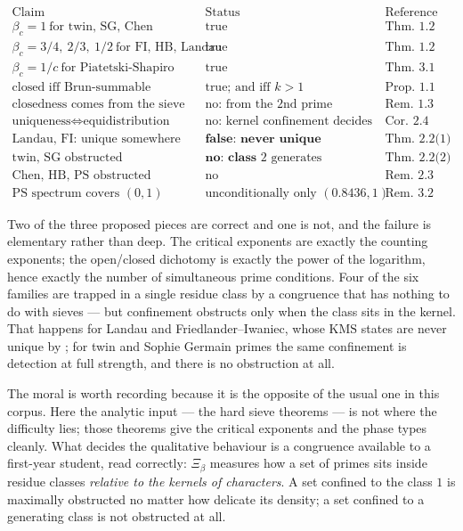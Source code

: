 \documentclass[11pt]{amsart}
\numberwithin{equation}{section}
\theoremstyle{definition}
\theoremstyle{remark}
\begin{document}
\[
\begin{array}{lll}
\text{Claim} & \text{Status} & \text{Reference}\\\hline
\beta_c=1\ \text{for twin, SG, Chen} & \text{true} & \text{Thm.~1.2}\\
\beta_c=3/4,\ 2/3,\ 1/2\ \text{for FI, HB, Landau} & \text{true} & \text{Thm.~1.2}\\
\beta_c=1/c\ \text{for Piatetski-Shapiro} & \text{true} & \text{Thm.~3.1}\\
\text{closed iff Brun-summable} & \text{true; and iff }k>1 & \text{Prop.~1.1}\\
\text{closedness comes from the sieve} & \text{no: from the 2nd prime condition} & \text{Rem.~1.3}\\
\text{uniqueness}\iff\text{equidistribution} & \text{no: kernel confinement decides} & \text{Cor.~2.4}\\
\text{Landau, FI: unique somewhere} & \textbf{false: never unique} & \text{Thm.~2.2(1)}\\
\text{twin, SG obstructed} & \textbf{no: class }2\text{ generates} & \text{Thm.~2.2(2)}\\
\text{Chen, HB, PS obstructed} & \text{no} & \text{Rem.~2.3}\\
\text{PS spectrum covers }(0,1) & \text{unconditionally only }(0.8436,1) & \text{Rem.~3.2}
\end{array}
\]

Two of the three proposed pieces are correct and one is not, and the failure is elementary
rather than deep. The critical exponents are exactly the counting exponents; the open/closed
dichotomy is exactly the power of the logarithm, hence exactly the number of simultaneous
prime conditions. Four of the six families are trapped in a single residue class by a
congruence that has nothing to do with sieves --- but confinement obstructs only when the
class sits in the kernel. That happens for Landau and Friedlander--Iwaniec, whose
$\mathrm{KMS}$ states are never unique by \cite[Thm.~3.9]{Main}; for twin and Sophie
Germain primes the same confinement is detection at full strength, and there is no
obstruction at all.

The moral is worth recording because it is the opposite of the usual one in this corpus. Here
the analytic input --- the hard sieve theorems --- is not where the difficulty lies; those
theorems give the critical exponents and the phase types cleanly. What decides the
qualitative behaviour is a congruence available to a first-year student, read correctly:
$\Xi_\beta$ measures how a set of primes sits inside residue classes \emph{relative to the
kernels of characters}. A set confined to the class $1$ is maximally obstructed no matter
how delicate its density; a set confined to a generating class is not obstructed at all.
\end{document}
